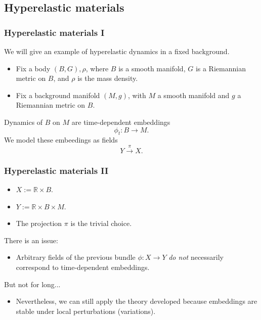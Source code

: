\subsection{Hyperelastic materials}
\begin{frame}
    \frametitle{Hyperelastic materials I}
    We will give an example of hyperelastic dynamics in a fixed background.
    \begin{itemize}
        \item Fix a \alert{body} $(B, G), \rho$, where $B$ is a smooth manifold, $G$ is a Riemannian metric on $B$, and $\rho$ is the mass density.
        \item Fix a background manifold $(M, g)$, with $M$ a smooth manifold and $g$ a Riemannian metric on $B$.
    \end{itemize}
    Dynamics of $B$ on $M$ are time-dependent embeddings $$\phi_t : B \rightarrow M.$$
    We model these embeedings as \alert{fields} $$Y \xrightarrow{\pi} X.$$
\end{frame}

\begin{frame}
    \frametitle{Hyperelastic materials II}
    \begin{itemize}
        \item $X := \mathbb{R} \times B.$
        \item $Y := \mathbb{R} \times B \times M.$
        \item The \alert{projection} $\pi$ is the trivial choice.
    \end{itemize}
    
    There is an \alert{issue}:
    \begin{itemize}
        \item Arbitrary fields of the previous bundle $\phi: X \rightarrow Y$ \textit{do not} necessarily correspond to
        time-dependent embeddings.
    \end{itemize}
    But not for long... 
    \begin{itemize}
        \item Nevertheless, we can still apply the theory developed because embeddings are stable under local perturbations (variations).
    \end{itemize}
\end{frame}

